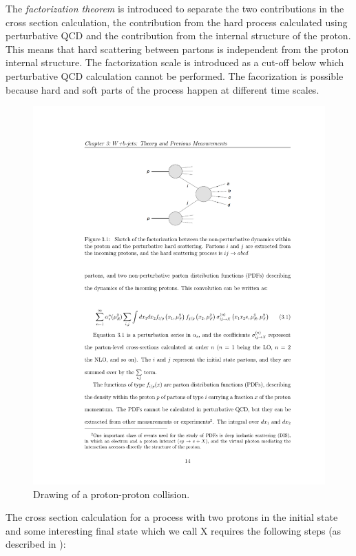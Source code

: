 	\par The \textit{ factorization theorem} is introduced to separate the two contributions in the cross section calculation, the contribution from the hard process calculated using perturbative QCD and the contribution from the internal structure of the proton. This means that hard scattering between partons is independent from the proton internal structure. The factorization scale is introduced as a cut-off below which perturbative QCD calculation cannot be performed.  The facorization is possible because hard and soft parts of the process happen at different time scales. 
	\begin{figure}[htbp]
	\centering
		\includegraphics{Figures/diagram.pdf}
	\caption[Drawing of a proton-proton collision]{Drawing of a proton-proton collision.}
	\label{fig:pp_drawing}
\end{figure}
The cross section calculation for a process with two protons in the initial state and some interesting final state which we call X requires the following steps (as described in \cite{Campbell:2006wx}):
